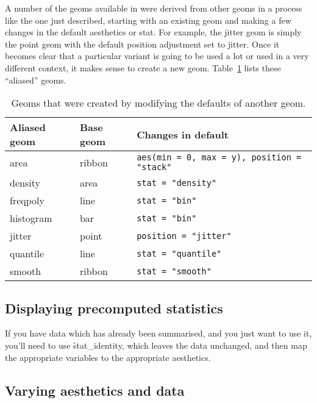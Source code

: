 A number of the geoms available in \ggplot were derived from other geoms in a process like the one just described, starting with an existing geom and making a few changes in the default aesthetics or stat.  For example, the jitter geom is simply the point geom with the default position adjustment set to jitter.  Once it becomes clear that a particular variant is going to be used a lot or used in a very different context, it makes sense to create a new geom. Table~\ref{tbl:aliased-geoms} lists these ``aliased'' geoms.

\begin{table}
  \begin{center}
  \begin{tabular}{lll}
    \toprule
    Aliased geom & Base geom & Changes in default \\
    \midrule
    area      & ribbon & \verb!aes(min = 0, max = y), position = "stack"!  \\
    density   & area   & \verb!stat = "density"!    \\
    freqpoly  & line   & \verb!stat = "bin"!        \\
    histogram & bar    & \verb!stat = "bin"!        \\
    jitter    & point  & \verb!position = "jitter"! \\
    quantile  & line   & \verb!stat = "quantile"!   \\
    smooth    & ribbon & \verb!stat = "smooth"!     \\
    \bottomrule
  \end{tabular}
  \end{center}
  \caption{Geoms that were created by modifying the defaults of another geom.}
  \label{tbl:aliased-geoms}
\end{table}

\subsection{Displaying precomputed statistics} 
\label{sub:precomputed}

If you have data which has already been summarised, and you just want to use it, you'll need to use \f{stat_identity}, which leaves the data unchanged, and then map the appropriate variables to the appropriate aesthetics.

\subsection{Varying aesthetics and data}
\label{sub:different_aesthetics}

